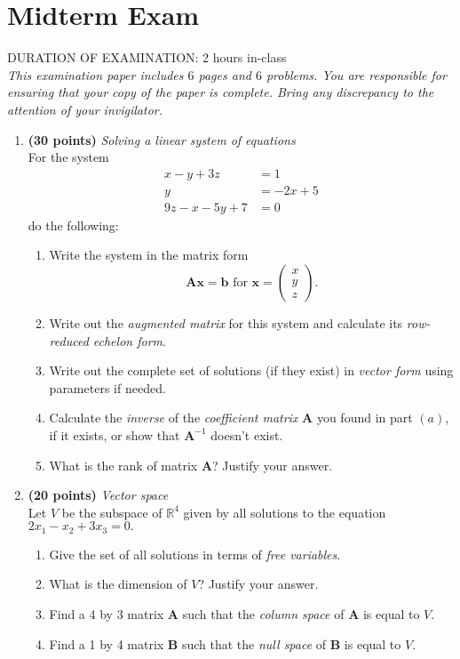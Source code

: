 \section{Midterm Exam}
DURATION OF EXAMINATION: 2 hours in-class\\
\textit{This examination paper includes $6$ pages and $6$ problems. You are responsible for ensuring that
your copy of the paper is complete. Bring any discrepancy to the attention of your invigilator.}\\
\begin{enumerate}
\item \textbf{(30 points)} \textit{Solving a linear system of equations}\\
For the system
\begin{align}
x-y+3z&=1\\
y&=-2x+5\\
9z-x-5y+7&=0
\end{align}
do the following:
\begin{enumerate}
\item
Write the system in the matrix form
\[
\bm{Ax}=\bm b\text{ for }\bm x=\begin{pmatrix}
x\\y\\z
\end{pmatrix}.
\]
\item
Write out the \textit{augmented matrix} for this system and calculate its \textit{row-reduced echelon form}.\\
\item
Write out the complete set of solutions (if they exist) in \textit{vector form} using parameters if
needed.\\
\item
Calculate the \textit{inverse} of the \textit{coefficient matrix} $\bm A$ you found in part $(a)$, if it exists, or show that $\bm A^{-1}$ doesn't exist.\\
\item
What is the rank of matrix $\bm A$? Justify your answer.
\end{enumerate}


\newpage
\item \textbf{(20 points)} \textit{Vector space}\\
Let $V$ be the subspace of $\mathbb{R}^4$ given by all solutions to the equation $2x_1-x_2+3x_3=0.$
\begin{enumerate}
\item
Give the set of all solutions in terms of \textit{free variables}.\\
\item
What is the dimension of $V$? Justify your answer.\\
\item
Find a 4 by 3 matrix $\bm A$ such that the \textit{column space} of $\bm A$ is equal to $V$.\\
\item
Find a 1 by 4 matrix $\bm B$ such that the \textit{null space} of $\bm B$ is equal to $V$.\end{enumerate}






\end{enumerate}
